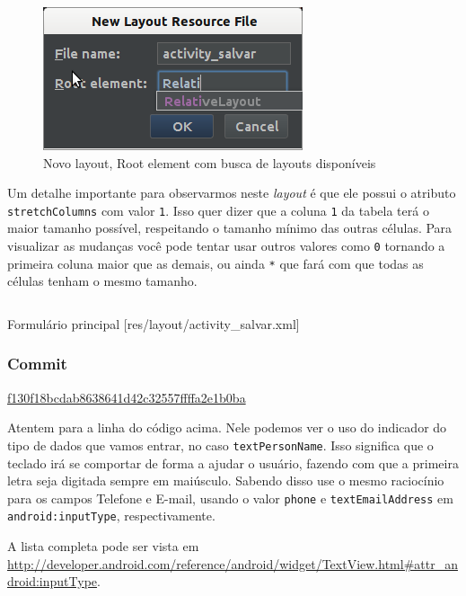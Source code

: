 \begin{figure}[h]
    \center
    \includegraphics[scale=0.6]{img/exemplo-pratico/new-layout-salvar.png}
    \caption{Novo layout, Root element com busca de layouts disponíveis}
\end{figure}

Um detalhe importante para observarmos neste \emph{layout} é que ele
possui o atributo \texttt{stretchColumns} com valor \texttt{1}. Isso
quer dizer que a coluna \texttt{1} da tabela terá o maior tamanho
possível, respeitando o tamanho mínimo das outras células. Para
visualizar as mudanças você pode tentar usar outros valores como
\texttt{0} tornando a primeira coluna maior que as demais, ou ainda
\texttt{*} que fará com que todas as células tenham o mesmo tamanho.

\begin{listing}[H]
  \inputminted[linenos=true,frame=bottomline,tabsize=3]{ xml }{ source/activity_salvar-1.xml }
  \caption{Formulário principal [res/layout/activity_salvar.xml]}
\end{listing}

\subsubsection{Commit}

\href{https://github.com/atilacamurca/guia-aberto-android-contatos/commit/f130f18bcdab8638641d42c32557ffffa2e1b0ba}{f130f18bcdab8638641d42c32557ffffa2e1b0ba}

\bigskip

Atentem para a linha  do código acima. Nele podemos ver o
uso do indicador do tipo de dados que vamos entrar, no caso
\texttt{textPersonName}. Isso significa que o teclado irá se comportar
de forma a ajudar o usuário, fazendo com que a primeira letra seja
digitada sempre em maiúsculo. Sabendo disso use o mesmo raciocínio para
os campos Telefone e E-mail, usando o valor \texttt{phone} e
\texttt{textEmailAddress} em \texttt{android:inputType},
respectivamente.

A lista completa pode ser vista em
\url{http://developer.android.com/reference/android/widget/TextView.html#attr_android:inputType}.

